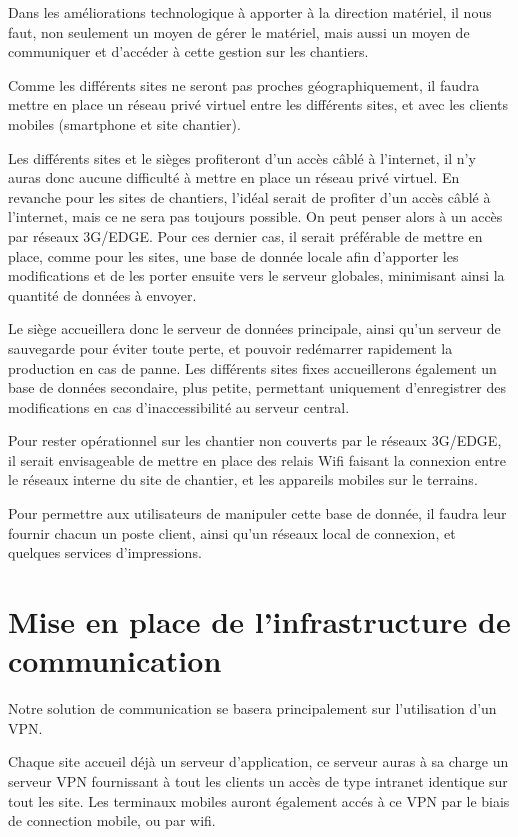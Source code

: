     Dans les améliorations technologique à apporter à la direction matériel, il nous faut, non seulement un moyen de gérer le matériel, mais aussi un moyen de communiquer et d'accéder à cette gestion sur les chantiers.

    Comme les différents sites ne seront pas proches géographiquement, il faudra mettre en place un réseau privé virtuel entre les différents sites, et avec les clients mobiles (smartphone et site chantier).

    Les différents sites et le sièges profiteront d'un accès câblé à l'internet, il n'y auras donc aucune difficulté à mettre en place un réseau privé virtuel.
    En revanche pour les sites de chantiers, l'idéal serait de profiter d'un accès câblé à l'internet, mais ce ne sera pas toujours possible.
    On peut penser alors à un accès par réseaux 3G/EDGE.
    Pour ces dernier cas, il serait préférable de mettre en place, comme pour les sites, une base de donnée locale afin d'apporter les modifications et de les porter ensuite vers le serveur globales, minimisant ainsi la quantité de données à envoyer.

    Le siège accueillera donc le serveur de données principale, ainsi qu'un serveur de sauvegarde pour éviter toute perte, et pouvoir redémarrer rapidement la production en cas de panne.
    Les différents sites fixes accueillerons également un base de données secondaire, plus petite, permettant uniquement d'enregistrer des modifications en cas d'inaccessibilité au serveur central.

    Pour rester opérationnel sur les chantier non couverts par le réseaux 3G/EDGE, il serait envisageable de mettre en place des relais Wifi faisant la connexion entre le réseaux interne du site de chantier, et les appareils mobiles sur le terrains.

    Pour permettre aux utilisateurs de manipuler cette base de donnée, il faudra leur fournir chacun un poste client, ainsi qu'un réseaux local de connexion, et quelques services d'impressions.

\section{Mise en place de l'infrastructure de communication}

    Notre solution de communication se basera principalement sur l'utilisation d'un VPN.

    Chaque site accueil déjà un serveur d'application, ce serveur auras à sa charge un serveur VPN fournissant à tout les clients un accès de type intranet identique sur tout les site.
    Les terminaux mobiles auront également accés à ce VPN par le biais de connection mobile, ou par wifi.

